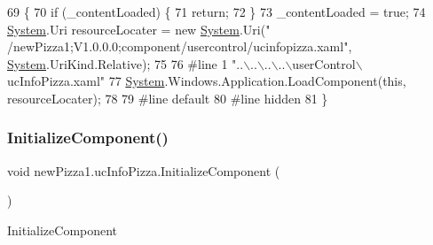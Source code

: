\begin{DoxyCode}
69                                           \{
70             \textcolor{keywordflow}{if} (\_contentLoaded) \{
71                 \textcolor{keywordflow}{return};
72             \}
73             \_contentLoaded = \textcolor{keyword}{true};
74             \hyperlink{namespaceSystem}{System}.Uri resourceLocater = \textcolor{keyword}{new} \hyperlink{namespaceSystem}{System}.Uri(\textcolor{stringliteral}{"
      /newPizza1;V1.0.0.0;component/usercontrol/ucinfopizza.xaml"}, \hyperlink{namespaceSystem}{System}.UriKind.Relative);
75             
76 \textcolor{preprocessor}{            #line 1 "..\(\backslash\)..\(\backslash\)..\(\backslash\)..\(\backslash\)userControl\(\backslash\)ucInfoPizza.xaml"
}
77             \hyperlink{namespaceSystem}{System}.Windows.Application.LoadComponent(\textcolor{keyword}{this}, resourceLocater);
78             
79 \textcolor{preprocessor}{            #line default
}
80 \textcolor{preprocessor}{            #line hidden
}
81         \}
\end{DoxyCode}
\mbox{\label{classnewPizza1_1_1ucInfoPizza_a5d6e37c02a381d24941d4f45b4a21dbe}} 
\subsubsection{\texorpdfstring{Initialize\+Component()}{InitializeComponent()}\hspace{0.1cm}{\footnotesize\ttfamily [5/6]}}
{\footnotesize\ttfamily void new\+Pizza1.\+uc\+Info\+Pizza.\+Initialize\+Component (\begin{DoxyParamCaption}{ }\end{DoxyParamCaption})\hspace{0.3cm}{\ttfamily [inline]}}



Initialize\+Component 


